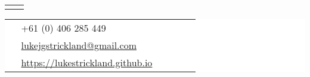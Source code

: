 \documentclass[10pt]{article} %
\begin{document}
\begin{paracol}{2}
\begin{supertabular}{rl}

	
	 


	

\end{supertabular}

\switchcolumn %

\parbox[top][0.05\textheight][c]{\linewidth}{ %
	\vspace{-0.05\textheight} %
	\colorbox{white}{ %
		\begin{supertabular}{p{0.05\linewidth}|p{0.775\linewidth}} %
			\raisebox{-1pt}{\faPhone} & +61 (0) 406 285 449 \\ %
			\raisebox{0pt}{\small\faEnvelope} & \href{mailto:lukejgstrickland@gmail.com}{lukejgstrickland@gmail.com} \\ %
			\raisebox{-1pt}{\faGithub1} & \href{https://lukestrickland.github.io}{https://lukestrickland.github.io} \\ %
                        
		\end{supertabular}
	}
}




\end{paracol}
\end{document}
